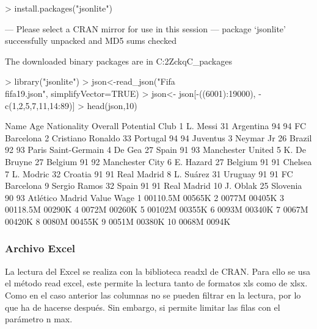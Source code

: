 \documentclass [a4paper] {article}
\begin{document}
\begin{Schunk}
\begin{Sinput}
> install.packages("jsonlite")
\end{Sinput}
\begin{Soutput}
--- Please select a CRAN mirror for use in this session ---
package ‘jsonlite’ successfully unpacked and MD5 sums checked

The downloaded binary packages are in
	C:\Users\Cliri\AppData\Local\Temp\Rtmp2ZckqC\downloaded_packages
\end{Soutput}
\begin{Sinput}
> library("jsonlite")
> json<-read_json("Fifa\\fifa19.json", simplifyVector=TRUE)
> json<- json[-((6001):19000), -c(1,2,5,7,11,14:89)]
> head(json,10)
\end{Sinput}
\begin{Soutput}
                Name Age Nationality Overall Potential                Club
1           L. Messi  31   Argentina      94        94        FC Barcelona
2  Cristiano Ronaldo  33    Portugal      94        94            Juventus
3          Neymar Jr  26      Brazil      92        93 Paris Saint-Germain
4             De Gea  27       Spain      91        93   Manchester United
5       K. De Bruyne  27     Belgium      91        92     Manchester City
6          E. Hazard  27     Belgium      91        91             Chelsea
7          L. Modric  32     Croatia      91        91         Real Madrid
8          L. Suárez  31     Uruguay      91        91        FC Barcelona
9       Sergio Ramos  32       Spain      91        91         Real Madrid
10          J. Oblak  25    Slovenia      90        93     Atlético Madrid
     Value  Wage
1  \200110.5M \200565K
2     \20077M \200405K
3  \200118.5M \200290K
4     \20072M \200260K
5    \200102M \200355K
6     \20093M \200340K
7     \20067M \200420K
8     \20080M \200455K
9     \20051M \200380K
10    \20068M  \20094K
\end{Soutput}
\end{Schunk}

\subsubsection{Archivo Excel}
La lectura del Excel se realiza con la biblioteca readxl de CRAN. Para ello se usa el método read excel, este permite la lectura tanto de formatos xls como de xlsx. 
Como en el caso anterior las columnas no se pueden filtrar en la lectura, por lo que ha de hacerse después. Sin embargo, si permite limitar las filas 
con el parámetro n max.
\end{document}
